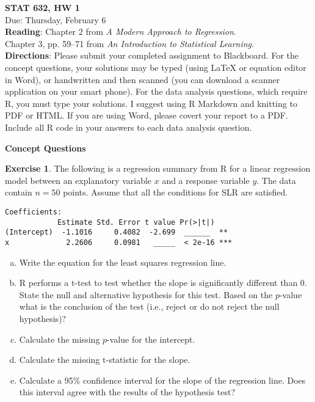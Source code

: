 \documentclass[11pt]{article}\usepackage[]{graphicx}\usepackage[]{color}
\begin{document}
\setlength\parindent{0pt}

\textbf{STAT 632, HW 1}\\
Due: Thursday, February 6\\

\textbf{Reading}: Chapter 2 from \emph{A Modern Approach to Regression}.\\
Chapter 3, pp. 59--71 from \emph{An Introduction to Statistical Learning}.\\

\textbf{Directions}:  Please submit your completed assignment to Blackboard.  For the concept questions, your solutions may be typed (using LaTeX or equation editor in Word), or handwritten and then scanned (you can download a scanner application on your smart phone).  For the data analysis questions, which require R, you must type your solutions.  I suggest using R Markdown and knitting to PDF or HTML.  If you are using Word, please covert your report to a PDF.  Include all R code in your answers to each data analysis question.\\
\vspace{10pt}

\Large
\textbf{Concept Questions}\\
\normalsize


\textbf{Exercise 1}.  The following is a regression summary from R for a linear regression model between an explanatory variable $x$ and a response variable $y$.  The data contain $n=50$ points.  Assume that all the conditions for SLR are satisfied.  
\begin{verbatim}
Coefficients:
            Estimate Std. Error t value Pr(>|t|)    
(Intercept)  -1.1016     0.4082  -2.699  ______  **
x             2.2606     0.0981   _____  < 2e-16 ***
\end{verbatim}

\begin{enumerate}[(a)]
\item Write the equation for the least squares regression line.
\item R performs a t-test to test whether the slope is significantly different than 0.  State the null and alternative hypothesis for this test.  Based on the $p$-value what is the conclusion of the test (i.e., reject or do not reject the null hypothesis)?
\item Calculate the missing $p$-value for the intercept.
\item Calculate the missing t-statistic for the slope.
\item Calculate a 95\% confidence interval for the slope of the regression line.  Does this interval agree with the results of the hypothesis test?\\
\end{enumerate}
\clearpage
\end{document}
